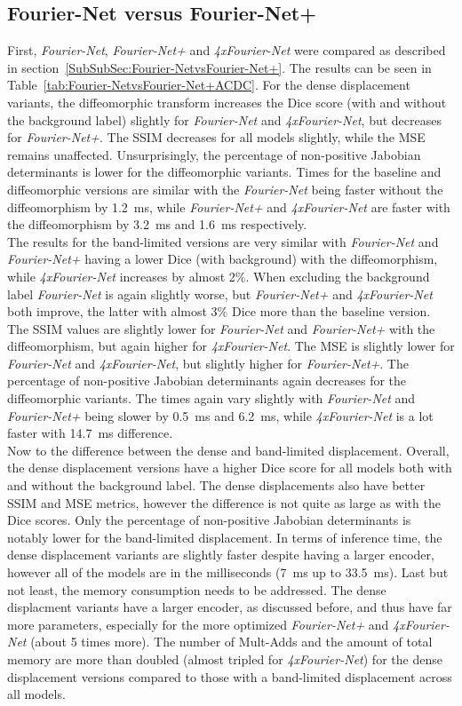 \subsection{Fourier-Net versus Fourier-Net+} \label{SubSec:ResultsFourier-NetvsFourier-Net+ACDC}
First, \emph{Fourier-Net}, \emph{Fourier-Net+} and \emph{4xFourier-Net} were compared as described in section~\ref{SubSubSec:Fourier-NetvsFourier-Net+}. The results can be seen in Table~\ref{tab:Fourier-NetvsFourier-Net+ACDC}. For the dense displacement variants, the diffeomorphic transform increases the Dice score (with and without the background label) slightly for \emph{Fourier-Net} and \emph{4xFourier-Net}, but decreases for \emph{Fourier-Net+}. The SSIM decreases for all models slightly, while the MSE remains unaffected. Unsurprisingly, the percentage of non-positive Jabobian determinants is lower for the diffeomorphic variants. Times for the baseline and diffeomorphic versions are similar with the \emph{Fourier-Net} being faster without the diffeomorphism by 1.2~ms, while \emph{Fourier-Net+} and \emph{4xFourier-Net} are faster with the diffeomorphism by 3.2~ms and 1.6~ms respectively. \\
The results for the band-limited versions are very similar with \emph{Fourier-Net} and \emph{Fourier-Net+} having a lower Dice (with background) with the diffeomorphism, while \emph{4xFourier-Net} increases by almost 2$\%$. When excluding the background label \emph{Fourier-Net} is again slightly worse, but \emph{Fourier-Net+} and \emph{4xFourier-Net} both improve, the latter with almost 3$\%$ Dice more than the baseline version. The SSIM values are slightly lower for \emph{Fourier-Net} and \emph{Fourier-Net+} with the diffeomorphism, but again higher for \emph{4xFourier-Net}. The MSE is slightly lower for \emph{Fourier-Net} and \emph{4xFourier-Net}, but slightly higher for \emph{Fourier-Net+}. The percentage of non-positive Jabobian determinants again decreases for the diffeomorphic variants. The times again vary slightly with \emph{Fourier-Net} and \emph{Fourier-Net+} being slower by 0.5~ms and 6.2~ms, while \emph{4xFourier-Net} is a lot faster with 14.7~ms difference.\\
Now to the difference between the dense and band-limited displacement. Overall, the dense displacement versions have a higher Dice score for all models both with and without the background label.  The dense displacements also have better SSIM and MSE metrics, however the difference is not quite as large as with the Dice scores.  Only the percentage of non-positive Jabobian determinants is notably lower for the band-limited displacement. In terms of inference time, the dense displacement variants are slightly faster despite having a larger encoder, however all of the models are in the milliseconds (7~ms up to 33.5~ms). Last but not least, the memory consumption needs to be addressed. The dense displacment variants have a larger encoder, as discussed before, and thus have far more parameters, especially for the more optimized \emph{Fourier-Net+} and \emph{4xFourier-Net} (about 5 times more). The number of Mult-Adds and the amount of total memory are more than doubled (almost tripled for \emph{4xFourier-Net}) for the dense displacement versions compared to those with a band-limited displacement across all models.

